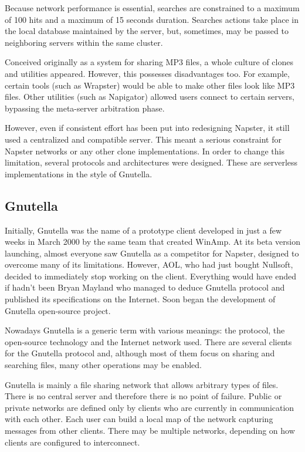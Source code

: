 Because network performance is essential, searches are constrained to a maximum
of 100 hits and a maximum of 15 seconds duration. Searches actions take place
in the local database maintained by the server, but, sometimes, may be passed
to neighboring servers within the same cluster.

Conceived originally as a system for sharing MP3 files, a whole culture of
clones and utilities appeared. However, this possesses disadvantages too. For
example, certain tools (such as Wrapster) would be able to make other files
look like MP3 files. Other utilities (such as Napigator) allowed users
connect to certain servers, bypassing the meta-server arbitration phase.

However, even if consistent effort has been put into redesigning Napster, it
still used a centralized and compatible server. This meant a serious
constraint for Napster networks or any other clone implementations. In order
to change this limitation, several protocols and architectures were designed.
These are serverless implementations in the style of Gnutella.

\subsection{Gnutella}

Initially, Gnutella was the name of a prototype client developed in just a few
weeks in March 2000 by the same team that created WinAmp. At its beta version
launching, almost everyone saw Gnutella as a competitor for Napster, designed
to overcome many of its limitations. However, AOL, who had just bought
Nullsoft, decided to immediately stop working on the client. Everything would
have ended if hadn't been Bryan Mayland who managed to deduce Gnutella
protocol and published its specifications on the Internet. Soon began the
development of Gnutella open-source project.

Nowadays Gnutella is a generic term with various meanings: the protocol, the
open-source technology and the Internet network used. There are several
clients for the Gnutella protocol and, although most of them focus on sharing
and searching files, many other operations may be enabled.

Gnutella is mainly a file sharing network that allows arbitrary types of
files. There is no central server and therefore there is no point of failure.
Public or private networks are defined only by clients who are currently in
communication with each other. Each user can build a local map of the network
capturing messages from other clients. There may be multiple networks,
depending on how clients are configured to interconnect.

